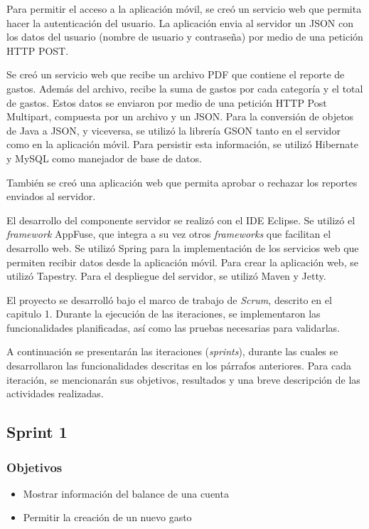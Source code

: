 Para permitir el acceso a la aplicación móvil, se creó un servicio web que permita hacer la autenticación del usuario. La aplicación envia al servidor un JSON con los datos del usuario (nombre de usuario y contraseña) por medio de una petición HTTP POST.

Se creó un servicio web que recibe un archivo PDF que contiene el reporte de gastos. Además del archivo, recibe la suma de gastos por cada categoría y el total de gastos. Estos datos se enviaron por medio de una petición HTTP Post Multipart, compuesta por un archivo y un JSON. Para la conversión de objetos de Java a JSON, y viceversa, se utilizó la librería GSON tanto en el servidor como en la aplicación móvil. Para persistir esta información, se utilizó Hibernate y MySQL como manejador de base de datos.

También se creó una aplicación web que permita aprobar o rechazar los reportes enviados al servidor.

El desarrollo del componente servidor se realizó con el IDE Eclipse. Se utilizó el \textit{framework} AppFuse, que integra a su vez otros \textit{frameworks} que facilitan el desarrollo web. Se utilizó Spring para la implementación de los servicios web que permiten recibir datos desde la aplicación móvil. Para crear la aplicación web, se utilizó Tapestry. Para el despliegue del servidor, se utilizó Maven y Jetty.

El proyecto se desarrolló bajo el marco de trabajo de \textit{Scrum}, descrito en el capitulo 1. Durante la ejecución de las iteraciones, se implementaron las funcionalidades planificadas, así como las pruebas necesarias para validarlas.

A continuación se presentarán las iteraciones (\textit{sprints}), durante las cuales se desarrollaron las funcionalidades descritas en los párrafos anteriores. Para cada iteración, se mencionarán sus objetivos, resultados y una breve descripción de las actividades realizadas.

\subsection{Sprint 1}

\subsubsection{Objetivos}
	\begin{itemize}
	\item Mostrar información del balance de una cuenta
	\item Permitir la creación de un nuevo gasto
	\end{itemize}

